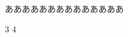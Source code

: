 \documentclass[b5j]{tbook}
\begin{document}
\begin{script}
	{ああああああああああああああ} 
	{\begin{audio}
		\item[] 
		\item[] 
	\end{audio}}

	
	 {3} {4}
\end{script}
\end{document}
